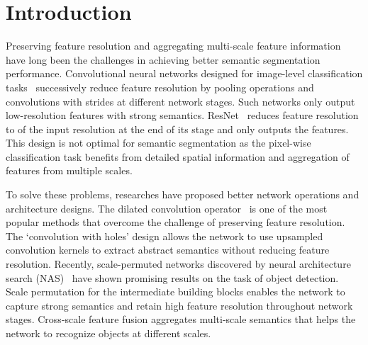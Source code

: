 \documentclass[10pt,twocolumn,letterpaper]{article}
\begin{document}
\section{Introduction}\label{sec:intro}
Preserving feature resolution and aggregating multi-scale feature information have long been the challenges in achieving better semantic segmentation performance. Convolutional neural networks designed for image-level classification tasks~\cite{alexnet,vgg,inceptionv2,inceptionv3,inceptionv4,xception,resnet,mobilenetv2,mobilenetv3} successively reduce feature resolution by pooling operations and convolutions with strides at different network stages. Such networks only output low-resolution features with strong semantics. \eg ResNet~\cite{resnet} reduces feature resolution to  of the input resolution at the end of its  stage and only outputs the  features. This design is not optimal for semantic segmentation as the pixel-wise classification task benefits from detailed spatial information and aggregation of features from multiple scales.

To solve these problems, researches have proposed better network operations and architecture designs. The dilated convolution operator~\cite{epitomic_conv,Yu2016MultiScaleCA,Chen2015SemanticIS,deeplabv1,deeplabv3,deeplabv3plus} is one of the most popular methods that overcome the challenge of preserving feature resolution. The `convolution with holes' design allows the network to use upsampled convolution kernels to extract abstract semantics without reducing feature resolution. Recently, scale-permuted networks discovered by neural architecture search (NAS)~\cite{spinenet,Du2020EfficientSB} have shown promising results on the task of object detection. Scale permutation for the intermediate building blocks enables the network to capture strong semantics and retain high feature resolution throughout network stages. Cross-scale feature fusion aggregates multi-scale semantics that helps the network to recognize objects at different scales.
\end{document}
